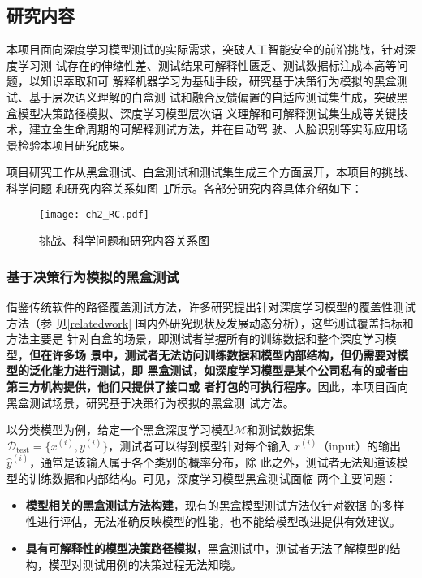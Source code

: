 \subsection{研究内容}\label{ch2content}

本项目面向深度学习模型测试的实际需求，突破人工智能安全的前沿挑战，针对深度学习测
试存在的伸缩性差、测试结果可解释性匮乏、测试数据标注成本高等问题，以知识萃取和可
解释机器学习为基础手段，研究基于决策行为模拟的黑盒测试、基于层次语义理解的白盒测
试和融合反馈偏置的自适应测试集生成，突破黑盒模型决策路径模拟、深度学习模型层次语
义理解和可解释测试集生成等关键技术，建立全生命周期的可解释测试方法，并在自动驾
驶、人脸识别等实际应用场景检验本项目研究成果。


项目研究工作从黑盒测试、白盒测试和测试集生成三个方面展开，本项目的挑战、科学问题
和研究内容关系如图~\ref{fig:ch2:rc}所示。各部分研究内容具体介绍如下：

\begin{figure}[htp]
    \begin{small}
        \begin{center}
            \texttt{[image: ch2\_RC.pdf]}
        \end{center}
        \caption{挑战、科学问题和研究内容关系图}
        \label{fig:ch2:rc}
    \end{small}
\end{figure}

\subsubsection{基于决策行为模拟的黑盒测试}

借鉴传统软件的路径覆盖测试方法，许多研究提出针对深度学习模型的覆盖性测试方法（参
见\ref{relatedwork} 国内外研究现状及发展动态分析），这些测试覆盖指标和方法主要是
针对白盒的场景，即测试者掌握所有的训练数据和整个深度学习模型，\textbf{但在许多场
景中，测试者无法访问训练数据和模型内部结构，但仍需要对模型的泛化能力进行测试，即
黑盒测试，如深度学习模型是某个公司私有的或者由第三方机构提供，他们只提供了接口或
者打包的可执行程序。}因此，本项目面向黑盒测试场景，研究基于决策行为模拟的黑盒测
试方法。

以分类模型为例，给定一个黑盒深度学习模型$\mathcal M$和测试数据集$\mathcal
D_{\text{test}}=\{x^{(i)},y^{(i)}\}$，测试者可以得到模型针对每个输入
$x^{(i)}$（input）的输出$\hat{y}^{(i)}$，通常是该输入属于各个类别的概率分布，除
此之外，测试者无法知道该模型的训练数据和内部结构。可见，深度学习模型黑盒测试面临
两个主要问题：
\begin{itemize}
    \item \textbf{模型相关的黑盒测试方法构建}，现有的黑盒模型测试方法仅针对数据
    的多样性进行评估，无法准确反映模型的性能，也不能给模型改进提供有效建议。
    \item \textbf{具有可解释性的模型决策路径模拟}，黑盒测试中，测试者无法了解模型的结
    构，模型对测试用例的决策过程无法知晓。
\end{itemize}

